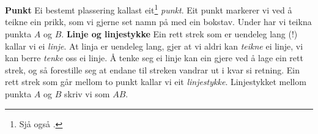 




\newpage
\section{\omgr}
\textbf{Punkt}\os
Ei bestemt plassering kallast eit\footnote{Sjå også .} \textit{punkt}. Eit punkt markerer vi ved å teikne ein prikk, som vi gjerne set namn på med ein bokstav. Under har vi teikna punkta $ A $ og $ B $.
\textbf{Linje og linjestykke}\os
Ein rett strek som er uendeleg lang (!) kallar vi ei \textit{linje}. At linja er uendeleg lang, gjer at vi aldri kan \textsl{teikne} ei linje, vi kan berre \textsl{tenke} oss ei linje. Å tenke seg ei linje kan ein gjere ved å lage ein rett strek, og så forestille seg at endane til streken vandrar ut i kvar si retning.
Ein rett strek som går mellom to punkt kallar vi eit \textit{linjestykke}.
Linjestykket mellom punkta $ A $ og $ B $ skriv vi som $ AB $. \vsk

